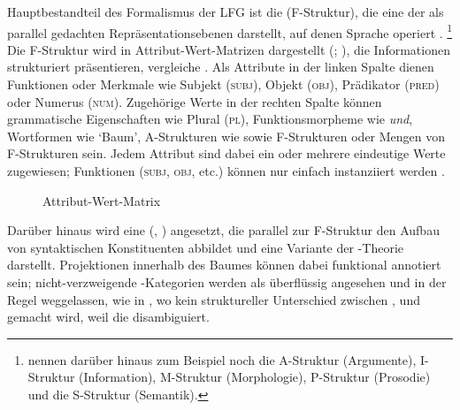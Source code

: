 Hauptbestandteil des Formalismus der LFG ist die 
(F-Struktur), die eine der als parallel gedachten Repräsentationsebenen
darstellt, auf denen Sprache operiert \autocite[840--844]{buttking2015}.%
%
	\footnote{\citet[862--865]{buttking2015} nennen darüber hinaus zum Beispiel
		noch die
		A-Struktur (Argumente),
		I-Struktur (Information),
		M-Struktur (Morphologie),
		P-Struktur (Prosodie)
		und die
		S-Struktur (Semantik).
	}
%
Die F-Struktur wird in
Attribut-Wert-Matrizen dargestellt
(;
\cites[vgl.][44--45]{bresnanetal2016}[207--221]{mueller2023}), die
Informationen strukturiert präsentieren, vergleiche . Als
Attribute in der linken Spalte dienen Funktionen oder
Merkmale wie Subjekt (\textsc{subj}), Objekt
(\textsc{obj}), Prädikator (\textsc{pred}) oder Numerus (\textsc{num}).
Zugehörige Werte in der rechten Spalte können grammatische Eigenschaften wie
Plural (\textsc{pl}), Funktionsmorpheme wie \textit{und}, Wortformen wie
`Baum', A-Strukturen wie  sowie F-Strukturen oder Mengen von
F-Struk\-turen sein. Jedem Attribut sind
dabei ein oder mehrere eindeutige Werte zugewiesen; Funktionen (\textsc{subj},
\textsc{obj}, etc.) können nur einfach instanziiert werden
\autocite[vgl.][44--58]{bresnanetal2016}.

\begin{figure}
\centering
	{%
	}
\caption{Attribut-Wert-Matrix \autocite[nach][209]{mueller2023}}
\label{fig:avm}
\end{figure}

Darüber hinaus wird eine  (, ) angesetzt, die parallel zur
F-Struktur den Aufbau von syntaktischen Konstituenten
abbildet und eine Variante der -Theorie
\autocites{chomsky1970,jackendoff1977} darstellt. Projektionen innerhalb des
Baumes können dabei funktional annotiert sein; nicht-verzweigende
-Kategorien werden als überflüssig angesehen und in der Regel
weggelassen, wie in , wo kein struktureller Unterschied
zwischen ,  und  gemacht wird,
weil die  disambiguiert.

